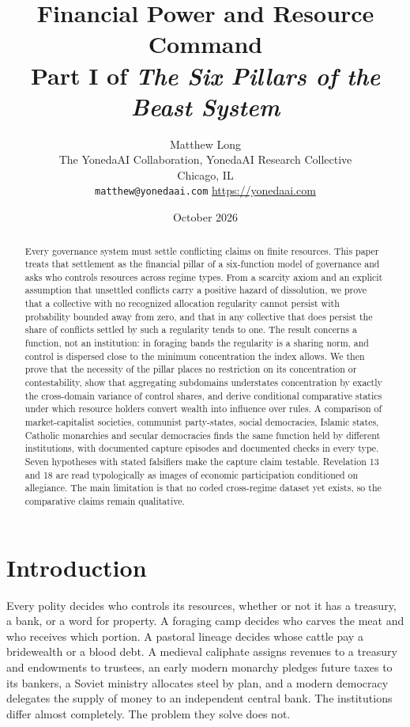 \documentclass[11pt,letterpaper]{article}
\title{Financial Power and Resource Command\\[4pt]
  {\normalsize Part I of \emph{The Six Pillars of the Beast System}}}
\author{Matthew Long\\
  \small The YonedaAI Collaboration, YonedaAI Research Collective\\
  \small Chicago, IL\\
  \small \texttt{matthew@yonedaai.com} \quad \url{https://yonedaai.com}}
\date{October 2026}
\theoremstyle{definition}
\theoremstyle{remark}
\begin{document}
\maketitle

\begin{abstract}
Every governance system must settle conflicting claims on finite resources. This paper treats that settlement as the financial pillar of a six-function model of governance and asks who controls resources across regime types. From a scarcity axiom and an explicit assumption that unsettled conflicts carry a positive hazard of dissolution, we prove that a collective with no recognized allocation regularity cannot persist with probability bounded away from zero, and that in any collective that does persist the share of conflicts settled by such a regularity tends to one. The result concerns a function, not an institution: in foraging bands the regularity is a sharing norm, and control is dispersed close to the minimum concentration the index allows. We then prove that the necessity of the pillar places no restriction on its concentration or contestability, show that aggregating subdomains understates concentration by exactly the cross-domain variance of control shares, and derive conditional comparative statics under which resource holders convert wealth into influence over rules. A comparison of market-capitalist societies, communist party-states, social democracies, Islamic states, Catholic monarchies and secular democracies finds the same function held by different institutions, with documented capture episodes and documented checks in every type. Seven hypotheses with stated falsifiers make the capture claim testable. Revelation 13 and 18 are read typologically as images of economic participation conditioned on allegiance. The main limitation is that no coded cross-regime dataset yet exists, so the comparative claims remain qualitative.
\end{abstract}

\section{Introduction}
\label{sec:intro}

Every polity decides who controls its resources, whether or not it has a treasury, a bank, or a word for property. A foraging camp decides who carves the meat and who receives which portion. A pastoral lineage decides whose cattle pay a bridewealth or a blood debt. A medieval caliphate assigns revenues to a treasury and endowments to trustees, an early modern monarchy pledges future taxes to its bankers, a Soviet ministry allocates steel by plan, and a modern democracy delegates the supply of money to an independent central bank. The institutions differ almost completely. The problem they solve does not.
\end{document}
